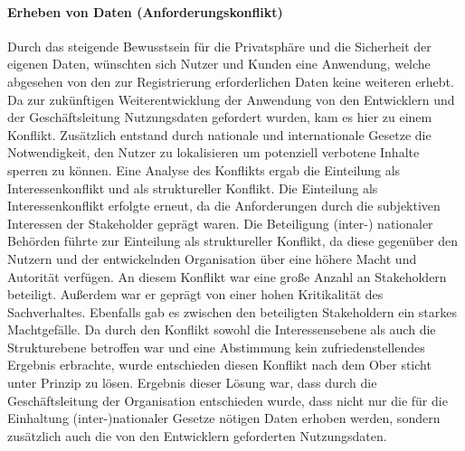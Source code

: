 \paragraph{Erheben von Daten (Anforderungskonflikt)}
Durch das steigende Bewusstsein für die Privatsphäre und die Sicherheit der eigenen Daten, wünschten sich Nutzer und Kunden
eine Anwendung, welche abgesehen von den zur Registrierung erforderlichen Daten keine weiteren erhebt.
Da zur zukünftigen Weiterentwicklung der Anwendung von den Entwicklern und der Geschäftsleitung Nutzungsdaten gefordert wurden,
kam es hier zu einem Konflikt.
Zusätzlich entstand durch nationale und internationale Gesetze die Notwendigkeit, den Nutzer zu lokalisieren um potenziell
verbotene Inhalte sperren zu können.
Eine Analyse des Konflikts ergab die Einteilung als Interessenkonflikt und als struktureller Konflikt.
Die Einteilung als Interessenkonflikt erfolgte erneut, da die Anforderungen durch die subjektiven Interessen der Stakeholder
geprägt waren.
Die Beteiligung (inter-) nationaler Behörden führte zur Einteilung als struktureller Konflikt, da diese gegenüber den
Nutzern und der entwickelnden Organisation über eine höhere Macht und Autorität verfügen.
An diesem Konflikt war eine große Anzahl an Stakeholdern beteiligt.
Außerdem war er geprägt von einer hohen Kritikalität des Sachverhaltes.
Ebenfalls gab es zwischen den beteiligten Stakeholdern ein starkes Machtgefälle.
Da durch den Konflikt sowohl die Interessensebene als auch die Strukturebene betroffen war und eine Abstimmung kein zufriedenstellendes
Ergebnis erbrachte, wurde entschieden diesen Konflikt nach dem Ober sticht unter Prinzip zu lösen.
Ergebnis dieser Lösung war, dass durch die Geschäftsleitung der Organisation entschieden wurde, dass nicht nur die für die
Einhaltung (inter-)nationaler Gesetze nötigen Daten erhoben werden, sondern zusätzlich auch die von den Entwicklern geforderten
Nutzungsdaten.